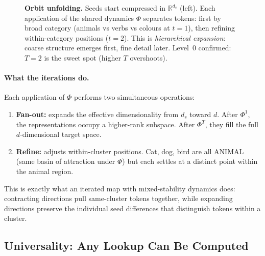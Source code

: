 \documentclass[11pt, a4paper]{article}
\newcommand{\R}{\mathbb{R}}
\theoremstyle{remark}
\begin{document}
\begin{figure}[h]
\caption{\textbf{Orbit unfolding.}
Seeds start compressed in $\R^{d_s}$ (left).
Each application of the shared dynamics $\Phi$ separates tokens:
first by broad category (animals vs verbs vs colours at $t{=}1$),
then refining within-category positions ($t{=}2$).
This is \emph{hierarchical expansion}: coarse structure emerges first, fine detail later.
Level~0 confirmed: $T{=}2$ is the sweet spot (higher $T$ overshoots).}
\label{fig:unfold}
\end{figure}

\paragraph{What the iterations do.}
Each application of $\Phi$ performs two simultaneous operations:
\begin{enumerate}[nosep]
    \item \textbf{Fan-out:} expands the effective dimensionality from $d_s$ toward $d$.
          After $\Phi^1$, the representations occupy a higher-rank subspace.
          After $\Phi^T$, they fill the full $d$-dimensional target space.
    \item \textbf{Refine:} adjusts within-cluster positions.
          Cat, dog, bird are all ANIMAL (same basin of attraction under $\Phi$)
          but each settles at a distinct point within the animal region.
\end{enumerate}

This is exactly what an iterated map with mixed-stability dynamics does:
contracting directions pull same-cluster tokens together, while expanding directions
preserve the individual seed differences that distinguish tokens within a cluster.


\subsection{Universality: Any Lookup Can Be Computed}
\end{document}
